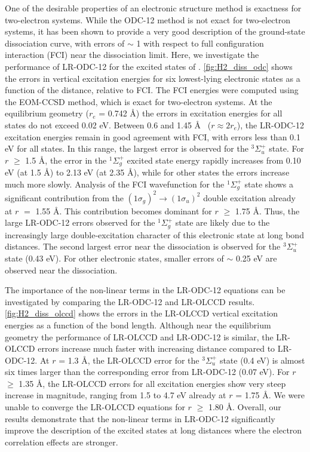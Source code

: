 One of the desirable properties of an electronic structure method is exactness
for two-electron systems. While the ODC-12 method is not exact for two-electron
systems, it has been shown to provide a very good description of the
ground-state  dissociation curve, with errors of $\sim$ 1 \kcal with
respect to full configuration interaction (FCI) near the dissociation
limit.\cite{Sokolov:2013p204110} Here, we investigate the performance of
LR-ODC-12 for the excited states of . \cref{fig:H2_diss_odc} shows the
errors in vertical excitation energies for six lowest-lying electronic states as
a function of the  distance, relative to FCI\@. The FCI energies were
computed using the EOM-CCSD method, which is exact for two-electron systems. At
the equilibrium geometry ($r_e$ = 0.742 \AA) the errors in excitation energies
for all states do not exceed 0.02 eV. Between 0.6 and 1.45 \AA\
(\mbox{$r\approx2r_e$}), the LR-ODC-12 excitation energies remain in
good agreement with FCI, with errors less than 0.1 eV for all states. In this
range, the largest error is observed for the $^3\Sigma_u^+$ state. For $r$ $\ge$
1.5 \AA, the error in the $^1\Sigma_g^+$ excited state energy rapidly increases
from 0.10 eV (at 1.5 \AA) to 2.13 eV (at 2.35 \AA), while for other states the
errors increase much more slowly. Analysis of the FCI wavefunction for the
$^1\Sigma_g^+$ state shows a significant contribution from the
$(1\sigma_g)^2\rightarrow(1\sigma_u)^2$ double excitation already at $r$ $=$
1.55 \AA\@. This contribution becomes dominant for $r$ $\ge$ 1.75 \AA\@. Thus, the large LR-ODC-12 errors observed for the $^1\Sigma_g^+$ state are likely due to the increasingly large double-excitation character of this electronic state at long  bond distances. The second largest error near the dissociation is observed for the $^3\Sigma_u^+$ state (0.43 eV). For other electronic states, smaller errors of $\sim$ 0.25 eV are observed near the dissociation.

The importance of the non-linear terms in the LR-ODC-12 equations can be
investigated by comparing the LR-ODC-12 and LR-OLCCD results.
\cref{fig:H2_diss_olccd} shows the errors in the LR-OLCCD vertical excitation
energies as a function of the \ce{H-H} bond length. Although near the
equilibrium geometry the performance of LR-OLCCD and LR-ODC-12 is similar, the
LR-OLCCD errors increase much faster with increasing \ce{H-H} distance compared
to LR-ODC-12. At $r$ = 1.3 \AA, the LR-OLCCD error for the $^3\Sigma_u^+$ state
(0.4 eV) is almost six times larger than the corresponding error from LR-ODC-12
(0.07 eV). For $r$ $\ge$ 1.35 \AA, the LR-OLCCD errors for all excitation
energies show very steep increase in magnitude, ranging from 1.5 to 4.7 eV
already at $r$ = 1.75 \AA\@. We were unable to converge the LR-OLCCD equations
for $r$ $\ge$ 1.80 \AA\@.
Overall, our results demonstrate that the non-linear terms in LR-ODC-12
significantly improve the description of the excited states at long 
distances where the electron correlation effects are stronger.

